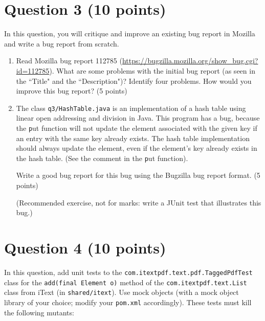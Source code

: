 \documentclass[10pt,hidelinks]{article}
\begin{document}
\section*{Question 3 (10 points)} 
In this question, you will critique and improve an existing bug report in Mozilla and write a bug report from scratch. 

\begin{enumerate}[label=(\alph*)]

\item Read Mozilla bug report 112785 (\url{https://bugzilla.mozilla.org/show_bug.cgi?id=112785}). What are some problems with the initial bug report (as seen in the ``Title" and the ``Description")? Identify four problems. How would you improve this bug report? (5 points)

\item
 The class {\tt q3/HashTable.java} is an implementation of a hash table using linear open addressing and division in Java.
This program has a bug, because the {\texttt put} function will not update the element associated with the given key if an entry with the same key already exists. The hash table implementation should always update the element, even if the element's key already exists in the hash table. (See the comment in the {\texttt put} function). 

Write a good bug report for this bug using the Bugzilla bug report format. (5 points)

(Recommended exercise, not for marks: write a JUnit test that illustrates this bug.)

 \end{enumerate}


\section*{Question 4 (10 points)} 

In this question, add unit tests to the {\tt com.itextpdf.text.pdf.TaggedPdfTest} class for the
{\tt add(final Element o)} method of the {\tt com.itextpdf.text.List} class from iText 
(in {\tt shared/itext}).
Use mock objects (with
a mock object library of your choice; modify your {\tt pom.xml} accordingly).
These tests must kill the following
mutants:
\end{document}
